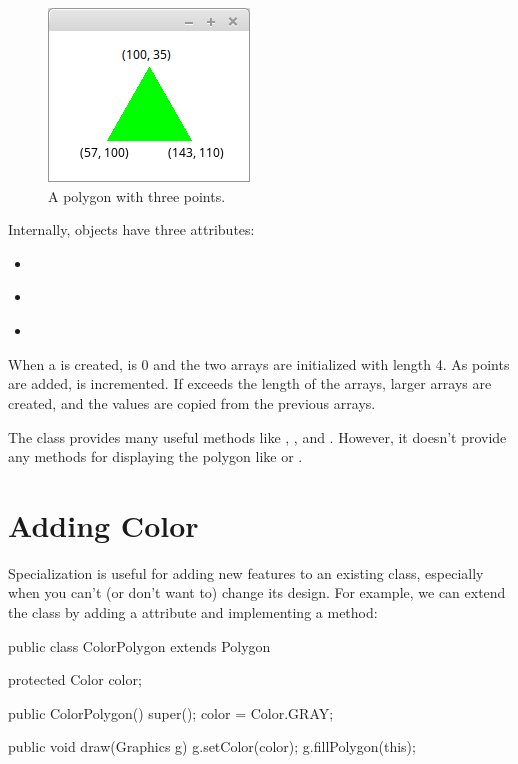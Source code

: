 \begin{figure}[!ht]
\begin{center}
\includegraphics{figs/triangle.png}
\caption{A polygon with three points.}
\label{fig:triangle}
\end{center}
\end{figure}

Internally,  objects have three attributes:

\begin{itemize}
\item {} {\tt ~~~} 
\item {} {\tt ~} 
\item {} {\tt ~} 
\end{itemize}

When a  is created,  is 0 and the two arrays are initialized with length 4.
As points are added,  is incremented.
If  exceeds the length of the arrays, larger arrays are created, and the values are copied from the previous arrays.

The  class provides many useful methods like , , and .
However, it doesn't provide any methods for displaying the polygon like  or .


\section{Adding Color}

Specialization is useful for adding new features to an existing class, especially when you can't (or don't want to) change its design.
For example, we can extend the  class by adding a  attribute and implementing a  method:

\begin{code}
public class ColorPolygon extends Polygon {
    protected Color color;

    public ColorPolygon() {
        super();
        color = Color.GRAY;
    }
    
    public void draw(Graphics g) {
        g.setColor(color);
        g.fillPolygon(this);
    }
}
\end{code}

